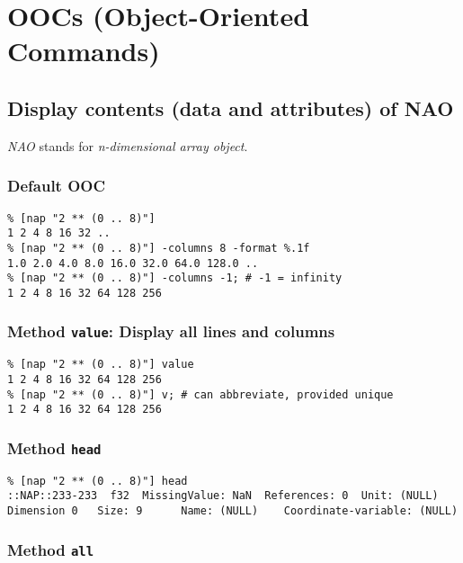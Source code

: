 
\section{OOCs (Object-Oriented Commands)}
    \label{demo-ooc}

\subsection{Display contents (data and attributes) of NAO}
    \label{demo-ooc-display}

\emph{NAO} stands for \emph{n-dimensional array object}.

\subsubsection{Default OOC}

    \begin{verbatim}
% [nap "2 ** (0 .. 8)"]
1 2 4 8 16 32 ..
% [nap "2 ** (0 .. 8)"] -columns 8 -format %.1f
1.0 2.0 4.0 8.0 16.0 32.0 64.0 128.0 ..
% [nap "2 ** (0 .. 8)"] -columns -1; # -1 = infinity
1 2 4 8 16 32 64 128 256
\end{verbatim}

\subsubsection{Method \texttt{value}: Display all lines and columns}

    \begin{verbatim}
% [nap "2 ** (0 .. 8)"] value
1 2 4 8 16 32 64 128 256
% [nap "2 ** (0 .. 8)"] v; # can abbreviate, provided unique
1 2 4 8 16 32 64 128 256
\end{verbatim}

\subsubsection{Method \texttt{head}}

    \begin{verbatim}
% [nap "2 ** (0 .. 8)"] head
::NAP::233-233  f32  MissingValue: NaN  References: 0  Unit: (NULL)
Dimension 0   Size: 9      Name: (NULL)    Coordinate-variable: (NULL)
\end{verbatim}

\subsubsection{Method \texttt{all}}

